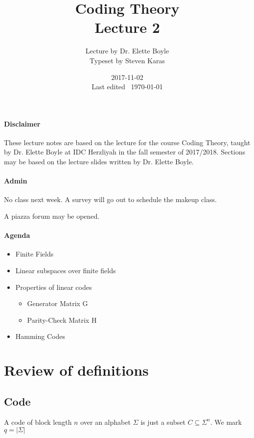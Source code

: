 \documentclass{idc_msc}
\title{Coding Theory\\\large Lecture 2}
\date{2017-11-02 \\ Last edited \currenttime\ \today}
\author{Lecture by Dr. Elette Boyle\\Typeset by Steven Karas}
\begin{document}
\maketitle

\paragraph{Disclaimer}

These lecture notes are based on the lecture for the course Coding Theory, taught by Dr. Elette Boyle at IDC Herzliyah in the fall semester of 2017/2018.
Sections may be based on the lecture slides written by Dr. Elette Boyle.

\paragraph{Admin}

No class next week.
A survey will go out to schedule the makeup class.

A piazza forum may be opened.

\paragraph{Agenda}

\begin{itemize}
  \item Finite Fields
  \item Linear subspaces over finite fields
  \item Properties of linear codes
    \begin{itemize}
      \item Generator Matrix G
      \item Parity-Check Matrix H
    \end{itemize}
  \item Hamming Codes
\end{itemize}

\section{Review of definitions}

\subsection{Code}

A code of block length $n$ over an alphabet $\Sigma$ is just a subset $C \subseteq \Sigma^n$. We mark $q=|\Sigma|$
\end{document}
